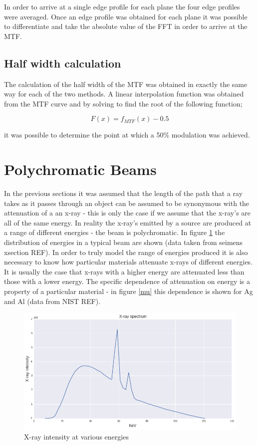 \documentclass[
  twoside,
  11pt, a4paper,
  footinclude=true,
  headinclude=true,
  cleardoublepage=empty
]{scrbook}
\begin{document}
In order to arrive at a single edge profile for each plane the four edge profiles were averaged. Once an edge profile was obtained for each plane it was possible to differentiate and take the absolute value of the FFT in order to arrive at the MTF.

\subsection{Half width calculation}

The calculation of the half width of the MTF was obtained in exactly the same way for each of the two methods. A linear interpolation function was obtained from the MTF curve and by solving to find the root of the following function;

\[
F(x) = f_{MTF}(x) - 0.5
\]

it was possible to determine the point at which a 50\% modulation was achieved.

\section{Polychromatic Beams}

In the previous sections it was assumed that the length of the path that a ray takes as it passes through an object can be assumed to be synonymous with the attenuation of a an x-ray - this is only the case if we assume that the x-ray's are all of the same energy. In reality the x-ray's emitted by a source are produced at a range of different energies - the beam is polychromatic. In figure \ref{spectrum} the distribution of energies in a typical beam are shown (data taken from seimens xsection REF). In order to truly model the range of energies produced it is also necessary to know how particular materials attenuate x-rays of different energies. It is usually the case that x-rays with a higher energy are attenuated less than those with a lower energy. The specific dependence of attenuation on energy is a property of a particular material - in figure \ref{mu} this dependence is shown for Ag and Al (data from NIST REF).

\begin{figure}[h!]
  \centering
    \includegraphics[width=\textwidth]{code/Polychromatic/Spectrum_Atenuation_Plots_files/Spectrum_Atenuation_Plots_3_0.png}
    \caption{X-ray intensity at various energies}
    \label{spectrum}
\end{figure}
\end{document}
